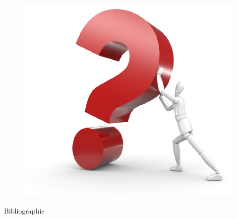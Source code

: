 \documentclass[11pt]{beamer}
\begin{document}
\begin{frame}{}
\begin{figure}
\centering
\includegraphics[scale=.5]{./img/questionimg}
\end{figure}

\end{frame}
\begin{frame}[allowframebreaks]{Bibliographie}
	
	\tiny
	 
\end{frame}
\end{document}

